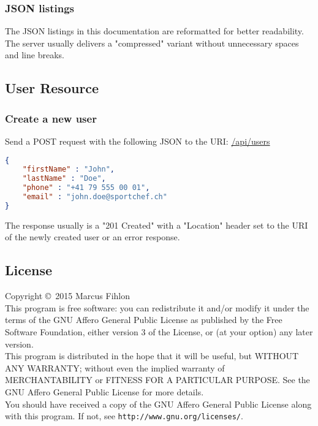 \documentclass[a4paper,openright,twoside]{report}
\renewcommand{\listoffigures}{\begingroup
	\tocchapter
	\tocfile{\listfigurename}{lof}
\endgroup}
\renewcommand{\listoftables}{\begingroup
	\tocchapter
	\tocfile{\listtablename}{lot}
\endgroup}
\begin{document}
\subsection{JSON listings}
The JSON listings in this documentation are reformatted for better readability. The server usually delivers a "compressed" variant without unnecessary spaces and line breaks.

\section{User Resource}

\subsection{Create a new user}
Send a POST request with the following JSON to the URI: \url{/api/users}

\begin{lstlisting}[language=json]
{
	"firstName" : "John",
	"lastName" : "Doe",
	"phone" : "+41 79 555 00 01",
	"email" : "john.doe@sportchef.ch"
}
\end{lstlisting}

The response usually is a "201 Created" with a "Location" header set to the URI of the newly created user or an error response.

\begin{appendix}

\listoffigures

\listoftables

\chapter{License}
Copyright \copyright\ 2015 Marcus Fihlon
\\[0.25cm]
This program is free software: you can redistribute it and/or modify it under the terms of the GNU Affero General Public License as published by the Free Software Foundation, either version 3 of the License, or (at your option) any later version.
\\[0.25cm]
This program is distributed in the hope that it will be useful, but WITHOUT ANY WARRANTY; without even the implied warranty of MERCHANTABILITY or FITNESS FOR A PARTICULAR PURPOSE. See the GNU Affero General Public License for more details.
\\[0.25cm]
You should have received a copy of the GNU Affero General Public License along with this program. If not, see \texttt{http://www.gnu.org/licenses/}.

\end{appendix}
\end{document}
